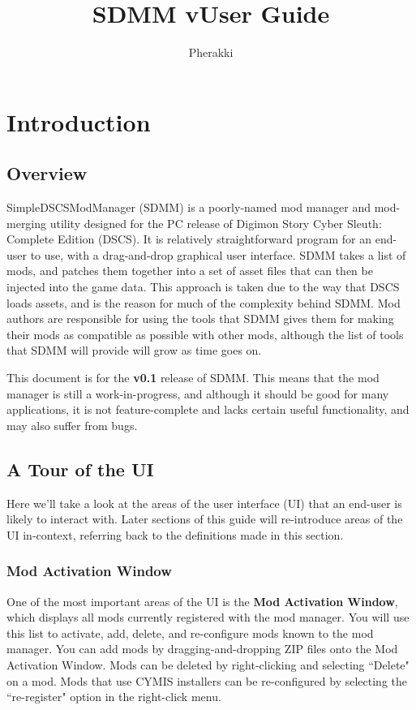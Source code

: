 \documentclass{article}
\title{SDMM v\cymisversion\space User Guide}
\author{Pherakki}
\date{}
\newcommand{\cymisversion}{0.1}
\begin{document}
\maketitle

\tableofcontents
\clearpage
{} 
\section{Introduction}
\subsection{Overview}
SimpleDSCSModManager (SDMM) is a poorly-named mod manager and mod-merging utility designed for the PC release of Digimon Story Cyber Sleuth: Complete Edition (DSCS). It is relatively straightforward program for an end-user to use, with a drag-and-drop graphical user interface. SDMM takes a list of mods, and patches them together into a set of asset files that can then be injected into the game data. This approach is taken due to the way that DSCS loads assets, and is the reason for much of the complexity behind SDMM. Mod authors are responsible for using the tools that SDMM gives them for making their mods as compatible as possible with other mods, although the list of tools that SDMM will provide will grow as time goes on.

This document is for the \textbf{v\cymisversion} release of SDMM. This means that the mod manager is still a work-in-progress, and although it should be good for many applications, it is not feature-complete and lacks certain useful functionality, and may also suffer from bugs.

\subsection{A Tour of the UI}\label{Section:UITour}
Here we'll take a look at the areas of the user interface (UI) that an end-user is likely to interact with. Later sections of this guide will re-introduce areas of the UI in-context, referring back to the definitions made in this section.

\subsubsection{Mod Activation Window}
One of the most important areas of the UI is the \textbf{Mod Activation Window}, which displays all mods currently registered with the mod manager. You will use this list to activate, add, delete, and re-configure mods known to the mod manager. You can add mods by dragging-and-dropping ZIP files onto the Mod Activation Window. Mods can be deleted by right-clicking and selecting ``Delete" on a mod. Mods that use CYMIS installers can be re-configured by selecting the ``re-register" option in the right-click menu.
\end{document}
